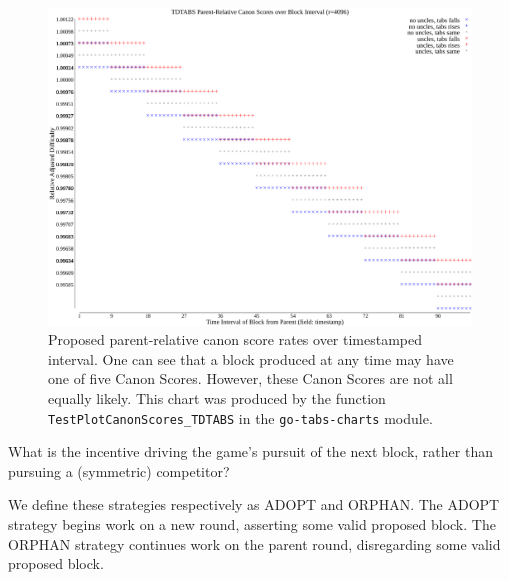 \documentclass[11pt]{article}
\theoremstyle{plain}
\begin{document}
{\begin{figure}[tph]
    \centering
    \includegraphics[width=1.0\textwidth]{imgs/tdtabs_canon_scores.png}
    \caption{
        Proposed parent-relative canon score rates over timestamped interval.
        One can see that a block produced at any time may have one of five Canon Scores.
        However, these Canon Scores are not all equally likely.
        This chart was produced by the function \texttt{TestPlotCanonScores\_TDTABS} in the \texttt{go-tabs-charts} module.
    }
    \label{fig:tdtabs_canon_scores}
\end{figure}

\clearpage
What is the incentive driving the game's pursuit of the next block, rather than pursuing a (symmetric) competitor?

We define these strategies respectively as ADOPT and ORPHAN.
The ADOPT strategy begins work on a new round, asserting some valid proposed block.
The ORPHAN strategy continues work on the parent round, disregarding some valid proposed block.

}
\end{document}
